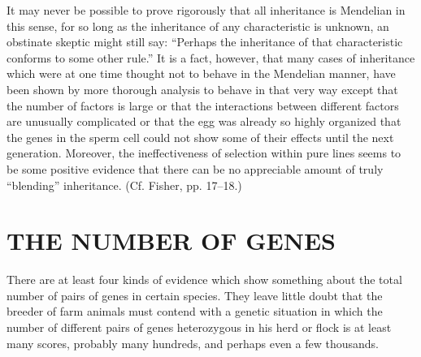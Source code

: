 It may never be possible to prove rigorously that all inheritance is Mendelian in this sense, for so long
as the inheritance of any characteristic is unknown, an obstinate skeptic might still say: ``Perhaps the
inheritance of that characteristic conforms to some other rule.'' It is a fact, however, that many cases
of inheritance which were at one time thought not to behave in the Mendelian manner, have been shown by
more thorough analysis to behave in that very way except that the number of factors is large or that the
interactions between different factors are unusually complicated or that the egg was already so highly
organized that the genes in the sperm cell could not show some of their effects until the next generation.
Moreover, the ineffectiveness of selection within pure lines seems to be some positive evidence that there
can be no appreciable amount of truly ``blending'' inheritance. (Cf. Fisher, pp. 17--18.)

\section*{THE NUMBER OF GENES}

There are at least four kinds of evidence which show something about the total number of pairs of genes in
certain species. They leave little doubt that the breeder of farm animals must contend with a genetic
situation in which the number of different pairs of genes heterozygous in his herd or flock is at least
many scores, probably many hundreds, and perhaps even a few thousands.

